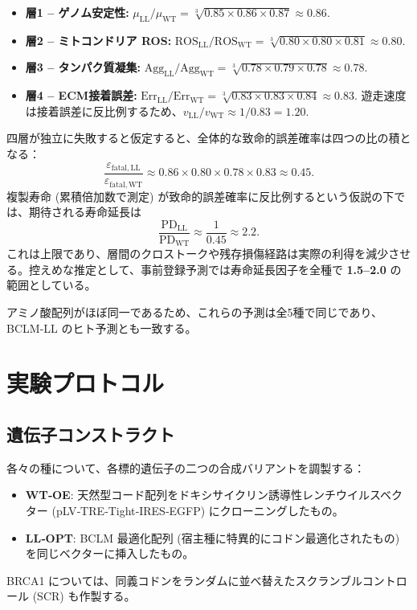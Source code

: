 \documentclass[12pt,a4paper]{ltjsarticle}
\begin{document}
	\begin{itemize}
		\item \textbf{層1 – ゲノム安定性:} \(\mu_{\mathrm{LL}}/\mu_{\mathrm{WT}} = \sqrt[3]{0.85\times0.86\times0.87} \approx 0.86\).
		\item \textbf{層2 – ミトコンドリア ROS:} \(\mathrm{ROS}_{\mathrm{LL}}/\mathrm{ROS}_{\mathrm{WT}} = \sqrt[3]{0.80\times0.80\times0.81} \approx 0.80\).
		\item \textbf{層3 – タンパク質凝集:} \(\mathrm{Agg}_{\mathrm{LL}}/\mathrm{Agg}_{\mathrm{WT}} = \sqrt[3]{0.78\times0.79\times0.78} \approx 0.78\).
		\item \textbf{層4 – ECM接着誤差:} \(\mathrm{Err}_{\mathrm{LL}}/\mathrm{Err}_{\mathrm{WT}} = \sqrt[3]{0.83\times0.83\times0.84} \approx 0.83\). 遊走速度は接着誤差に反比例するため、\(v_{\mathrm{LL}}/v_{\mathrm{WT}} \approx 1/0.83 = 1.20\).
	\end{itemize}
	
	四層が独立に失敗すると仮定すると、全体的な致命的誤差確率は四つの比の積となる：
	\[
	\frac{\varepsilon_{\mathrm{fatal,LL}}}{\varepsilon_{\mathrm{fatal,WT}}} \approx 0.86 \times 0.80 \times 0.78 \times 0.83 \approx 0.45.
	\]
	複製寿命 (累積倍加数で測定) が致命的誤差確率に反比例するという仮説の下では、期待される寿命延長は
	\[
	\frac{\mathrm{PD}_{\mathrm{LL}}}{\mathrm{PD}_{\mathrm{WT}}} \approx \frac{1}{0.45} \approx 2.2.
	\]
	これは上限であり、層間のクロストークや残存損傷経路は実際の利得を減少させる。控えめな推定として、事前登録予測では寿命延長因子を全種で \textbf{1.5–2.0} の範囲としている。
	
	アミノ酸配列がほぼ同一であるため、これらの予測は全5種で同じであり、BCLM‑LL のヒト予測とも一致する。
	
	\section{実験プロトコル}
	\label{sec:protocol}
	
	\subsection{遺伝子コンストラクト}
	各々の種について、各標的遺伝子の二つの合成バリアントを調製する：
	\begin{itemize}
		\item \textbf{WT‑OE}: 天然型コード配列をドキシサイクリン誘導性レンチウイルスベクター (pLV‑TRE‑Tight‑IRES‑EGFP) にクローニングしたもの。
		\item \textbf{LL‑OPT}: BCLM 最適化配列 (宿主種に特異的にコドン最適化されたもの) を同じベクターに挿入したもの。
	\end{itemize}
	BRCA1 については、同義コドンをランダムに並べ替えたスクランブルコントロール (SCR) も作製する。
	
\end{document}
